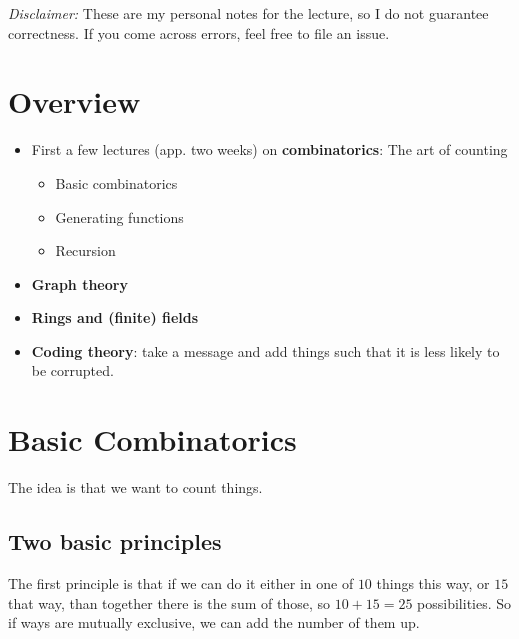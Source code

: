 \documentclass[english]{lbscript}
\begin{document}


\tableofcontents{}

\vfill

\emph{Disclaimer:} These are my personal notes for the lecture, so I do not guarantee correctness. If you come across errors, feel free to file an issue.

\pagebreak

\section{Overview}
\label{sec:overview}

\begin{itemize}
  \item  First a few lectures (app. two weeks) on \textbf{combinatorics}: The art of counting
        \begin{itemize}
          \item Basic combinatorics
          \item Generating functions
          \item Recursion
        \end{itemize}
  \item \textbf{Graph theory} %
  \item \textbf{Rings and (finite) fields}
  \item \textbf{Coding theory}: take a message and add things such that it is less likely to be corrupted.
\end{itemize}


\section{Basic Combinatorics}
\label{sec:basic-combinatorics}

The idea is that we want to count things.

\subsection{Two basic principles}
\label{sec:two-basic-principles}


The first principle is that if we can do it either in one of \(10\) things this way, or \(15\) that way, than together there is the sum of those, so \(10+15=25\) possibilities. So if ways are mutually exclusive, we can add the number of them up.
\end{document}
